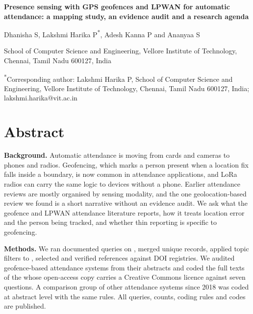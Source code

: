 \documentclass[12pt]{article}
\begin{document}
\begin{titlepage}\raggedright
{\Large\bfseries Presence sensing with GPS geofences and LPWAN for automatic attendance: a mapping study, an evidence audit and a research agenda}\par\vspace{1.5em}
Dhanisha S, Lakshmi Harika P\textsuperscript{*}, Adesh Kanna P and Ananyaa S\par\vspace{0.5em}
School of Computer Science and Engineering, Vellore Institute of Technology, Chennai, Tamil Nadu 600127, India\par\vspace{1.5em}
\textsuperscript{*}Corresponding author: Lakshmi Harika P, School of Computer Science and Engineering, Vellore Institute of Technology, Chennai, Tamil Nadu 600127, India; lakshmi.harika@vit.ac.in
\end{titlepage}
\raggedright
\section*{Abstract}
\textbf{Background.} Automatic attendance is moving from cards and cameras to phones and radios. Geofencing, which marks a person present when a location fix falls inside a boundary, is now common in attendance applications, and LoRa radios can carry the same logic to devices without a phone. Earlier attendance reviews are mostly organised by sensing modality, and the one geolocation-based review we found is a short narrative without an evidence audit. We ask what the geofence and LPWAN attendance literature reports, how it treats location error and the person being tracked, and whether thin reporting is specific to geofencing.

\textbf{Methods.} We ran \nQueriesAll{} documented queries on \srcPhrase{}, merged \unionUnique{} unique records, applied topic filters to \nStageOne{}, selected \nSelected{} and verified \nVerified{} references against DOI registries. We audited \nAudit{} geofence-based attendance systems from their abstracts and coded the full texts of the \ftN{} whose open-access copy carries a Creative Commons licence against seven questions. \coderAbs{} A comparison group of \nOthersRecent{} other attendance systems since 2018 was coded at abstract level with the same rules. All queries, counts, coding rules and codes are published.
\end{document}
